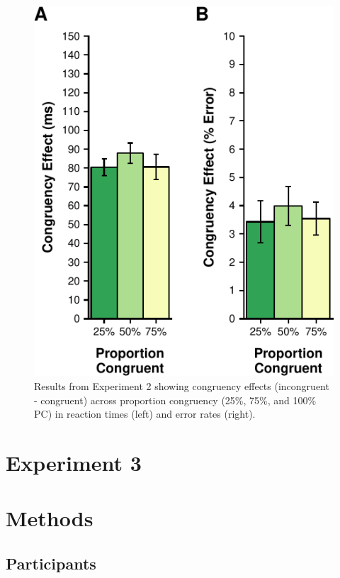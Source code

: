 \documentclass[english,,man,floatsintext]{apa6}
\begin{document}
\begin{figure}
\centering
\includegraphics{manuscript_pretty_files/figure-latex/figure3-1.pdf}
\caption{\label{fig:figure3}Results from Experiment 2 showing congruency effects (incongruent - congruent) across proportion congruency (25\%, 75\%, and 100\% PC) in reaction times (left) and error rates (right).}
\end{figure}



\hypertarget{experiment-3}{%
\section{Experiment 3}\label{experiment-3}}

\hypertarget{methods-2}{%
\section{Methods}\label{methods-2}}

\hypertarget{participants-2}{%
\subsection{Participants}\label{participants-2}}
\end{document}
